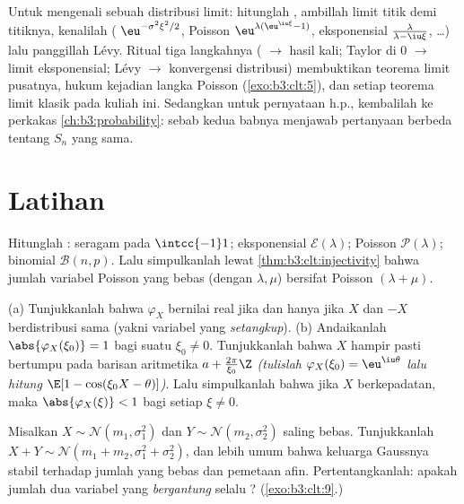 \begin{method}\label{met:b3:clt:method}
Untuk mengenali sebuah distribusi limit: hitunglah ,
ambillah limit titik demi titiknya, kenalilah (
$\eu^{-\sigma^2\xi^2/2}$, Poisson
$\eu^{\lambda(\eu^{\iu\xi}-1)}$, eksponensial $\frac{\lambda}
{\lambda - \iu\xi}$, \dots) lalu panggillah Lévy. Ritual tiga
langkahnya ( $\to$ hasil kali; Taylor di $0$ $\to$
limit eksponensial; Lévy $\to$ konvergensi distribusi) membuktikan
teorema limit pusatnya, hukum kejadian langka Poisson
(\cref{exo:b3:clt:5}), dan setiap teorema limit klasik pada
kuliah ini. Sedangkan untuk pernyataan h.p., kembalilah ke
perkakas \cref{ch:b3:probability}: sebab kedua babnya menjawab
pertanyaan berbeda tentang $S_n$ yang sama.
\end{method}

\section{Latihan}

\begin{exercise}[$\star$]\label{exo:b3:clt:1}
Hitunglah : seragam pada
$\intcc{-1}1$; eksponensial $\mathcal E(\lambda)$; Poisson
$\mathcal P(\lambda)$; binomial $\mathcal B(n, p)$. Lalu simpulkanlah
lewat \cref{thm:b3:clt:injectivity} bahwa jumlah variabel Poisson
yang bebas (dengan $\lambda, \mu$) bersifat Poisson $(\lambda +
\mu)$.
\end{exercise}

\begin{exercise}[$\star\star$]\label{exo:b3:clt:2}
(a) Tunjukkanlah bahwa $\varphi_X$ bernilai real jika dan hanya jika $X$
dan $-X$ berdistribusi sama (yakni variabel yang \emph{setangkup}).
(b) Andaikanlah $\abs{\varphi_X(\xi_0)} = 1$ bagi suatu $\xi_0 \neq
0$. Tunjukkanlah bahwa $X$ hampir pasti bertumpu pada barisan
aritmetika $a + \frac{2\pi}{\xi_0}\Z$ \emph{(tulislah
$\varphi_X(\xi_0) = \eu^{\iu\theta}$ lalu hitung $\E[1 -
\cos(\xi_0X - \theta)]$)}. Lalu simpulkanlah bahwa jika $X$ berkepadatan,
maka $\abs{\varphi_X(\xi)} < 1$ bagi setiap $\xi \neq 0$.
\end{exercise}

\begin{exercise}[$\star\star$]\label{exo:b3:clt:3}
Misalkan $X \sim \mathcal N(m_1, \sigma_1^2)$ dan $Y \sim
\mathcal N(m_2, \sigma_2^2)$ saling bebas. Tunjukkanlah $X + Y
\sim \mathcal N(m_1 + m_2, \sigma_1^2 + \sigma_2^2)$, dan
lebih umum bahwa keluarga Gaussnya stabil terhadap
jumlah yang bebas dan pemetaan afin. Pertentangkanlah: apakah jumlah
dua variabel  yang \emph{bergantung} selalu ?
(\cref{exo:b3:clt:9}.)
\end{exercise}

